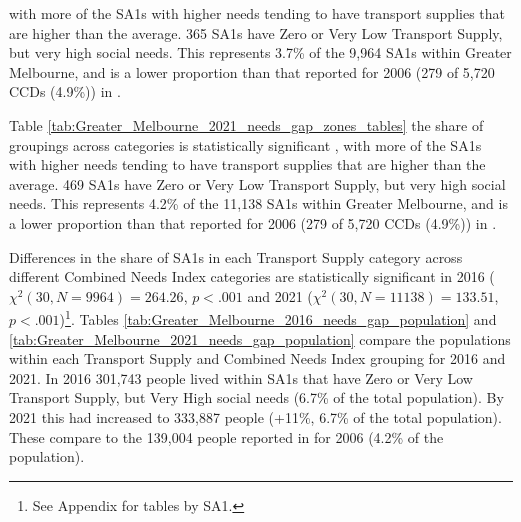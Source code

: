 \documentclass[preprint, 3p,
authoryear]{elsarticle} %
\begin{document}
with more of the SA1s with higher needs tending to have transport
supplies that are higher than the average. 365 SA1s have Zero or Very
Low Transport Supply, but very high social needs. This represents 3.7\%
of the 9,964 SA1s within Greater Melbourne, and is a lower proportion
than that reported for 2006 (279 of 5,720 CCDs (4.9\%)) in
\citet{currie2010identifying}.

Table \ref{tab:Greater_Melbourne_2021_needs_gap_zones_tables} the share
of groupings across categories is statistically significant , with more
of the SA1s with higher needs tending to have transport supplies that
are higher than the average. 469 SA1s have Zero or Very Low Transport
Supply, but very high social needs. This represents 4.2\% of the 11,138
SA1s within Greater Melbourne, and is a lower proportion than that
reported for 2006 (279 of 5,720 CCDs (4.9\%)) in
\citet{currie2010identifying}.

Differences in the share of SA1s in each Transport Supply category
across different Combined Needs Index categories are statistically
significant in 2016 (\(\chi^2(30, N = 9964) = 264.26\), \(p < .001\) and
2021 (\(\chi^2(30, N = 11138) = 133.51\), \(p < .001\))\footnote{See
  Appendix for tables by SA1.}. Tables
\ref{tab:Greater_Melbourne_2016_needs_gap_population} and
\ref{tab:Greater_Melbourne_2021_needs_gap_population} compare the
populations within each Transport Supply and Combined Needs Index
grouping for 2016 and 2021. In 2016 301,743 people lived within SA1s
that have Zero or Very Low Transport Supply, but Very High social needs
(6.7\% of the total population). By 2021 this had increased to 333,887
people (+11\%, 6.7\% of the total population). These compare to the
139,004 people reported in \citet{currie2010identifying} for 2006 (4.2\%
of the population).
\end{document}
